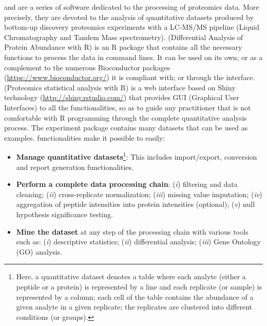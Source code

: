 \documentclass[12pt]{article}
\begin{document}
 and  are a series of software dedicated to 
the processing of proteomics data. More precisely, they are devoted to the 
analysis of quantitative datasets produced by bottom-up discovery proteomics 
experiments with a LC-MS/MS pipeline (Liquid Chromatography and Tandem Mass 
spectrometry).
 (Differential Analysis of Protein Abundance with R) is an R 
package that contains all the necessary functions to process the data in 
command lines. It can be used on its own; or as a complement to the numerous 
Bioconductor packages (\url{https://www.bioconductor.org/}) it is compliant with; 
or through the  interface.
 (Proteomics statistical analysis with R) is a 
web interface based on Shiny technology (\url{http://shiny.rstudio.com/}) that provides GUI 
(Graphical User Interfaces)
to all the  functionalities, so as to guide any 
practitioner that is not comfortable with R programming through the complete 
quantitative analysis process.
 The experiment package  contains 
many datasets that can be used as examples.
 functionalities make it possible to easily:
\begin{itemize}
\item \textbf{Manage quantitative datasets}\footnote{Here, a quantitative dataset 
denotes a table where each analyte (either a peptide or a protein) is represented
by a line and each replicate (or sample) is represented by a column; 
each cell of the table contains the abundance of a given analyte in a given replicate; 
the replicates are clustered into different conditions (or groups).}: This includes
import/export, conversion and report generation functionalities.
\item \textbf{Perform a complete data processing chain}: (\emph{i}) filtering and data cleaning; 
(\emph{ii}) cross-replicate normalization; (\emph{iii}) missing value imputation; (\emph{iv}) aggregation of peptide 
intensities into protein intensities (optional); (\emph{v}) null hypothesis significance testing.
\item \textbf{Mine the dataset} at any step of the processing chain with various tools such as:
(\emph{i}) descriptive statistics; (\emph{ii}) differential analysis; (\emph{iii}) Gene Ontology (GO) analysis.
\end{itemize}


\end{document}
